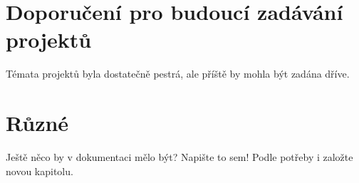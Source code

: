 \documentclass[11pt,a4paper]{article}
\begin{document}
\section{Doporučení pro budoucí zadávání projektů}

Témata projektů byla dostatečně pestrá, ale příště by mohla být zadána dříve.

\section{Různé}

Ještě něco by v dokumentaci mělo být? Napište to sem! Podle potřeby i založte
novou kapitolu.
\end{document}
